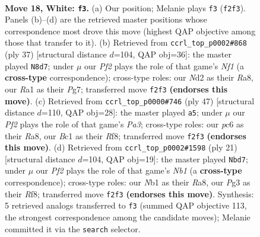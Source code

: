 \documentclass[11pt]{article}
\begin{document}
\clearpage

\begin{figure}[p]\centering
\begin{subfigure}{0.46\textwidth}\centering
\resizebox{\linewidth}{!}{%
\newchessgame
\chessboard[
  setfen={rnb1r1k1/p3b2p/2p2pp1/1p1qp3/3P3P/1P1Q2P1/P2NPPK1/RNB2R2 w - - 0 18},
  showmover=false,
  pgfstyle=straightmove, color=movearrow, markmove={f2-f3}
]}
\caption{}
\end{subfigure}\hfill
\begin{subfigure}{0.46\textwidth}\centering
\resizebox{\linewidth}{!}{%
\newchessgame
\chessboard[
  setfen={r3rnk1/5ppp/1p1q1n2/pPpp4/P2P4/Q3PP2/4N1PP/1RB2RK1 b - - 1 19},
  showmover=false,
  pgfstyle=straightmove, color=movearrow, markmove={f8-d7}
]}
\caption{}
\end{subfigure}
\\[4pt]
\begin{subfigure}{0.46\textwidth}\centering
\resizebox{\linewidth}{!}{%
\newchessgame
\chessboard[
  setfen={r4r2/2pqn1pk/p4bnp/1p2pp1Q/PP6/2PP2PP/2B2P2/R1B1RNK1 b - - 1 24},
  showmover=false,
  pgfstyle=straightmove, color=movearrow, markmove={a6-a5}
]}
\caption{}
\end{subfigure}\hfill
\begin{subfigure}{0.46\textwidth}\centering
\resizebox{\linewidth}{!}{%
\newchessgame
\chessboard[
  setfen={rn1q1rk1/pb3pp1/1p2pn1p/2Pp4/2P4B/P1Q1PP2/1P4PP/R3KBNR b KQ - 0 11},
  showmover=false,
  pgfstyle=straightmove, color=movearrow, markmove={b8-d7}
]}
\caption{}
\end{subfigure}
\caption{\textbf{Move 18, White: \texttt{f3}.} (a) Our position; Melanie plays \texttt{f3} (\texttt{f2f3}). Panels (b)--(d) are the retrieved master positions whose correspondence most drove this move (highest QAP objective among those that transfer to it). (b) Retrieved from \texttt{ccrl\_top\_p0002\#868} (ply 37) [structural distance $d$=104, QAP obj=36]: the master played \texttt{N8d7}; under $\mu$ our \emph{Pf2} plays the role of that game's \emph{Nf1} (a \textbf{cross-type} correspondence); cross-type roles: our \emph{N}d2 as their \emph{R}a8, our \emph{R}a1 as their \emph{P}g7; transferred move \texttt{f2f3} \textbf{(endorses this move)}. (c) Retrieved from \texttt{ccrl\_top\_p0000\#746} (ply 47) [structural distance $d$=110, QAP obj=28]: the master played \texttt{a5}; under $\mu$ our \emph{Pf2} plays the role of that game's \emph{Pa3}; cross-type roles: our \emph{p}c6 as their \emph{R}a8, our \emph{B}c1 as their \emph{R}f8; transferred move \texttt{f2f3} \textbf{(endorses this move)}. (d) Retrieved from \texttt{ccrl\_top\_p0002\#1598} (ply 21) [structural distance $d$=104, QAP obj=19]: the master played \texttt{Nbd7}; under $\mu$ our \emph{Pf2} plays the role of that game's \emph{Nb1} (a \textbf{cross-type} correspondence); cross-type roles: our \emph{N}b1 as their \emph{R}a8, our \emph{P}g3 as their \emph{R}f8; transferred move \texttt{f2f3} \textbf{(endorses this move)}. Synthesis: 5 retrieved analogs transferred to \texttt{f3} (summed QAP objective 113, the strongest correspondence among the candidate moves); Melanie committed it via the \texttt{search} selector.}
\label{fig:thought-m34}
\end{figure}
\end{document}
